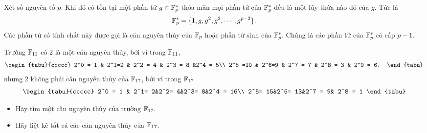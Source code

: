 \begin{frame}
  \begin{thrm}
    Xét số nguyên tố $p$. Khi đó có tồn tại một phần tử $g \in \mathbb{F}_p^*$ thỏa mãn mọi phần tử của $\mathbb{F}_p^*$ đều là một lũy thừa nào đó của $g$. Tức là 
    $$
    \mathbb{F}_p^* = \{1, g, g^2, g^3, \cdots, g^{p-2}\}.
    $$ 
Các phần tử có tính chất này được gọi là căn nguyên thủy của $\mathbb{F}_p$ hoặc phần tử sinh của $\mathbb{F}_p^*$. Chúng là các phần tử của $\mathbb{F}_p^*$ có cấp $p-1$.
  \end{thrm}
\end{frame}

\begin{frame}
  \begin{xmpl}
    Trường $\mathbb{F}_{11}$ có $2$ là một căn nguyên thủy, bởi vì trong $\mathbb{F}_{11}$,
    $$\begin{tabu}{ccccc}
      2^0 = 1 &  2^1=2 & 2^2 = 4 & 2^3 = 8  &2^4 = 5\\
      2^5 =10 &  2^6=9 & 2^7 = 7 & 2^8 = 3  & 2^9 = 6. 
    \end{tabu}$$
    nhưng $2$ không phải căn nguyên thủy của $\mathbb{F}_{17}$, bởi vì trong $\mathbb{F}_{17}$
    $$\begin{tabu}{ccccc}
      2^0 = 1 & 2^1= 2&2^2= 4&2^3= 8&2^4 =  16\\
      2^5= 15&2^6= 13&2^7 = 9& 2^8 = 1
    \end{tabu}$$
  \end{xmpl}
\end{frame}

\begin{frame}
  \begin{xrcs}
    \begin{itemize}
    \item Hãy tìm một căn nguyên thủy của trường $\mathbb{F}_{17}$.
    \item Hãy liệt kê tất cả các căn nguyên thủy của $\mathbb{F}_{17}$.
    \end{itemize}

  \end{xrcs}
\end{frame}




